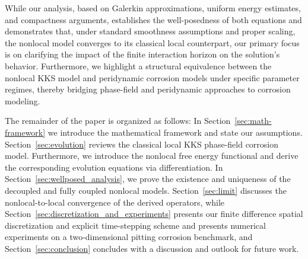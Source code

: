 \documentclass[]{article}
\begin{document}
While our analysis, based on Galerkin approximations, uniform energy estimates, and compactness arguments, establishes the well-posedness of both equations and demonstrates that, under standard smoothness assumptions and proper scaling, the nonlocal model converges to its classical local counterpart, our primary focus is on clarifying the impact of the finite interaction horizon on the solution's behavior. Furthermore, we highlight a structural equivalence between the nonlocal KKS model and peridynamic corrosion models under specific parameter regimes, thereby bridging phase-field and peridynamic approaches to corrosion modeling. 

The remainder of the paper is organized as follows: In Section~\ref{sec:math-framework} we introduce the mathematical framework and state our assumptions. Section~\ref{sec:evolution} reviews the classical local KKS phase-field corrosion model. Furthermore, we introduce the nonlocal free energy functional and derive the corresponding evolution equations via  differentiation. In Section~\ref{sec:wellposed_analysis}, we prove the existence and uniqueness of the decoupled and fully coupled nonlocal models.  Section~\ref{sec:limit} discusses the nonlocal-to-local convergence of the derived operators, while Section~\ref{sec:discretization_and_experiments} presents our finite difference spatial discretization and explicit time-stepping scheme and presents numerical experiments on a two-dimensional pitting corrosion benchmark, and Section~\ref{sec:conclusion} concludes with a discussion and outlook for future work.
\end{document}
